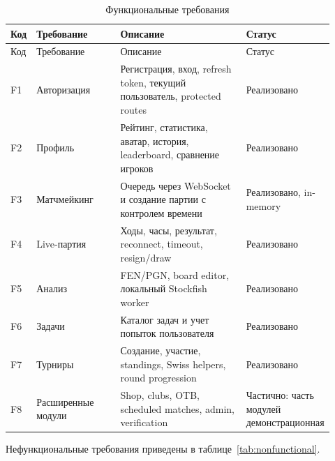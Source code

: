 \documentclass[14pt,a4paper]{extreport}
\begin{document}
\begin{center}
\scriptsize
\setlength{\tabcolsep}{4pt}
\renewcommand{\arraystretch}{1.25}
\begin{longtable}{|>{\RaggedRight\arraybackslash}p{0.08\linewidth}|>{\RaggedRight\arraybackslash}p{0.28\linewidth}|>{\RaggedRight\arraybackslash}p{0.46\linewidth}|>{\RaggedRight\arraybackslash}p{0.10\linewidth}|}
\caption{Функциональные требования}\label{tab:functional}\\
\hline
Код & Требование & Описание & Статус\\ \hline
\endfirsthead
\hline
Код & Требование & Описание & Статус\\ \hline
\endhead
F1 & Авторизация & Регистрация, вход, refresh token, текущий пользователь, protected routes & Реализовано\\ \hline
F2 & Профиль & Рейтинг, статистика, аватар, история, leaderboard, сравнение игроков & Реализовано\\ \hline
F3 & Матчмейкинг & Очередь через WebSocket и создание партии с контролем времени & Реализовано, in-memory\\ \hline
F4 & Live-партия & Ходы, часы, результат, reconnect, timeout, resign/draw & Реализовано\\ \hline
F5 & Анализ & FEN/PGN, board editor, локальный Stockfish worker & Реализовано\\ \hline
F6 & Задачи & Каталог задач и учет попыток пользователя & Реализовано\\ \hline
F7 & Турниры & Создание, участие, standings, Swiss helpers, round progression & Реализовано\\ \hline
F8 & Расширенные модули & Shop, clubs, OTB, scheduled matches, admin, verification & Частично: часть модулей демонстрационная\\ \hline
\end{longtable}
\end{center}

Нефункциональные требования приведены в таблице~\ref{tab:nonfunctional}.
\end{document}
